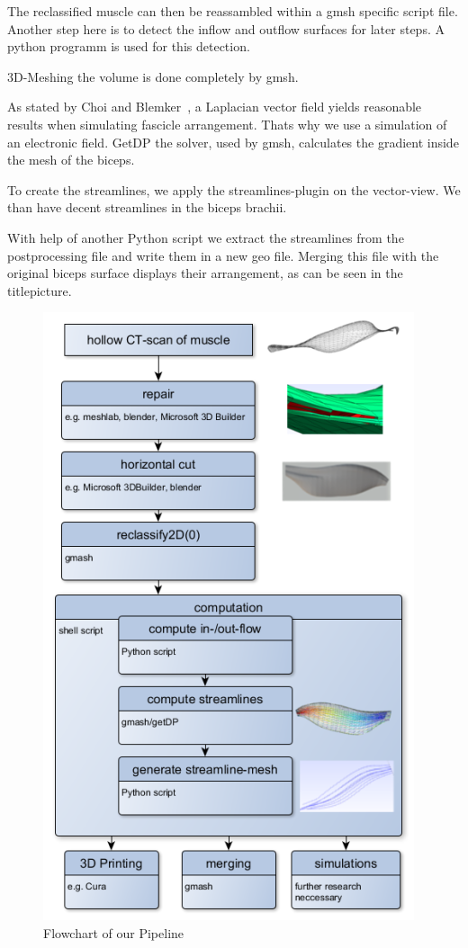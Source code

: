 \documentclass[preprint,journal]{vgtc}       %
\begin{document}
The reclassified muscle can then be reassambled within a gmsh specific script file. Another step here is to detect the inflow and outflow surfaces for later steps. A python programm is used for this detection. 

3D-Meshing the volume is done completely by gmsh. %
 
As stated by Choi and Blemker~\cite{Choi2013}, a Laplacian vector field yields reasonable results when simulating fascicle arrangement. Thats why we use a simulation of an electronic field. GetDP the solver, used by gmsh, calculates the gradient inside the mesh of the biceps.

To create the streamlines, we apply the streamlines-plugin on the vector-view. We than have decent streamlines in the biceps brachii.

With help of another Python script we extract the streamlines from the postprocessing file and write them in a new geo file. Merging this file with the original biceps surface displays their arrangement, as can be seen in the titlepicture.
\begin{figure}
	\begin{center}
		\includegraphics[width=.7\linewidth]{flow.png}
	\end{center}
	\caption{Flowchart of our Pipeline}
	\label{fig:flow}
	
\end{figure}
\end{document}
